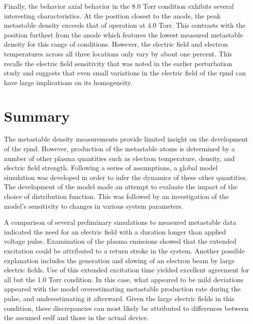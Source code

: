 Finally, the behavior axial behavior in the 8.0 Torr condition exhibits several
interesting characteristics. At the position closest to the anode, the peak
metastable density exceeds that of operation at 4.0 Torr. This contrasts with
the position furthest from the anode which features the lowest measured
metastable density for this range of conditions. However, the electric field and
electron temperatures across all three locations only vary by about one percent.
This recalls the electric field sensitivity that was noted in the earlier
perturbation study and suggests that even small variations in the electric field
of the \acs{rpnd} can have large implications on its homogeneity.

\section{Summary}

The metastable density measurements provide limited insight on the development
of the \acs{rpnd}. However, production of the metastable atoms is determined by
a number of other plasma quantities such as electron temperature, density, and
electric field strength. Following a series of assumptions, a global model
simulation was developed in order to infer the dynamics of these other
quantities. The development of the model made an attempt to evaluate the impact
of the choice of distribution function. This was followed by an investigation of
the model's sensitivity to changes in various system parameters.

A comparison of several preliminary simulations to measured metastable data
indicated the need for an electric field with a duration longer than applied
voltage pulse. Examination of the plasma emissions showed that the extended
excitation could be attributed to a return stroke in the system. Another
possible explanation includes the generation and slowing of an electron beam by
large electric fields. Use of this extended excitation time yielded excellent
agreement for all but the 1.0 Torr condition. In this case, what appeared to be
mild deviations appeared with the model overestimating metastable production
rate during the pulse, and underestimating it afterward. Given the large
electric fields in this condition, these discrepancies can most likely be
attributed to differences between the assumed \acs{eedf} and those in the actual
device.

